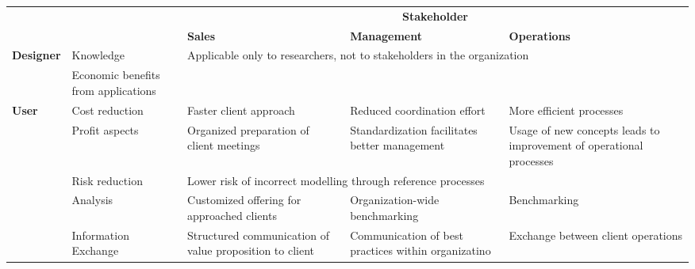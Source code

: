 \begin{table}[caption={Benefits of Reference Modelling for BPO-providers in CRM }, label=tab:refmodbpobenefits]
	\centering
	\begin{tabular}{p{1cm} p{2cm} |p{3cm} | p{3cm} | p{3cm} |}
		\cline{3-5}
		&                                     & \multicolumn{3}{c|}{\textbf{Stakeholder}}                                                                                                                                           \\ \cline{3-5} 
		&                                     & \textbf{Sales}                                          & \textbf{Management}                                 & \textbf{Operations}                                                 \\ \hline
		\multicolumn{1}{|l|}{\multirow{2}{*}{\textbf{Designer}}} & Knowledge                           & \multicolumn{3}{p{3cm}|}{\multirow{2}{*}{\parbox{9cm}{Applicable only to researchers, not to stakeholders in the organization}}}                                                                       \\ \cline{2-2}
		\multicolumn{1}{|l|}{}                                   & Economic benefits from applications & \multicolumn{3}{l|}{}                                                                                                                                                               \\ \hline
		\multicolumn{1}{|l|}{\multirow{5}{*}{\textbf{User}}}     & Cost reduction                      & Faster client approach                                  & Reduced coordination effort                         & More efficient processes                                            \\ \cline{2-5} 
		\multicolumn{1}{|l|}{}                                   & Profit aspects                      & Organized preparation of client meetings                & Standardization facilitates better management       & Usage of new concepts leads to improvement of operational processes \\ \cline{2-5} 
		\multicolumn{1}{|l|}{}                                   & Risk reduction                      & \multicolumn{3}{l|}{\parbox{9cm}{Lower risk of incorrect modelling through reference processes}}                                                                                                  \\ \cline{2-5} 
		\multicolumn{1}{|l|}{}                                   & Analysis                            & Customized offering for approached clients              & Organization-wide benchmarking                     & Benchmarking                                                        \\ \cline{2-5} 
		\multicolumn{1}{|l|}{}                                   & Information Exchange                & Structured communication of value proposition to client & Communication of best practices within organizatino & Exchange between client operations                                  \\ \hline
	\end{tabular}
\end{table}
